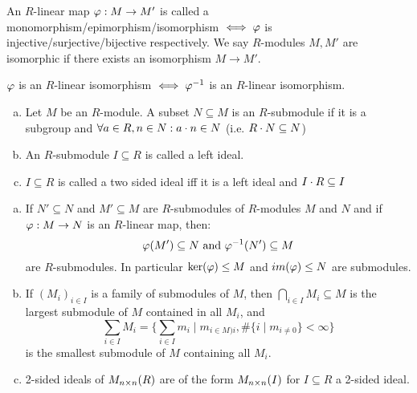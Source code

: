 \documentclass[a4paper]{report}
\begin{document}
\begin{defi}
An $R$-linear map $\varphi: M \to M'$ is called a monomorphism/epimorphism/isomorphism $\iff \varphi$ is injective/surjective/bijective respectively. We say $R$-modules $M, M'$ are isomorphic if there exists an isomorphism $M \to M'$.
\end{defi}
\begin{rem*}
$\varphi$ is an $R$-linear isomorphism $\iff \varphi^{-1}$ is an $R$-linear isomorphism.
\end{rem*}

\begin{defi}
\begin{enumerate}[(a)]
  \item Let $M$ be an $R$-module. A subset $N \subseteq M$ is an $R$-submodule if it is a subgroup and $\forall a \in R, n \in N : a \cdot n \in N$ (i.e. $R \cdot N \subseteq N$)
  \item An $R$-submodule $I \subseteq R$ is called a left ideal.
        \item $I \subseteq R$ is called a two sided ideal iff it is a left ideal and $I \cdot R \subseteq I$
\end{enumerate}
\end{defi}

\begin{exmp}
\begin{enumerate}[(a)]
  \item If $N' \subseteq N$ and $M' \subseteq M$ are $R$-submodules of $R$-modules $M$ and $N$ and if $\varphi: M \to N$ is an $R$-linear map, then: \[\varphi(M') \subseteq N \text{ and } \varphi^{-1}(N') \subseteq M\]
        are $R$-submodules. In particular $\ker(\varphi) \le M$ and $im(\varphi) \le N$ are submodules.
  \item If $(M_{i})_{i \in I}$ is a family of submodules of $M$, then $\bigcap_{i \in I}M_{i} \subseteq M$ is the largest submodule of $M$ contained in all $M_{i}$, and \[\sum_{i \in I} M_{i} = \{\sum_{i \in I}m_{i} \mid m_{i \in M)i}, \#\{i \mid m_{i \ne 0}\} < \infty\}\]
        is the smallest submodule of $M$ containing all $M_{i}$.
        \item 2-sided ideals of $M_{n \times n}(R)$ are of the form $M_{n \times n}(I)$ for $I \subseteq R$ a 2-sided ideal.
\end{enumerate}
\end{exmp}
\end{document}
